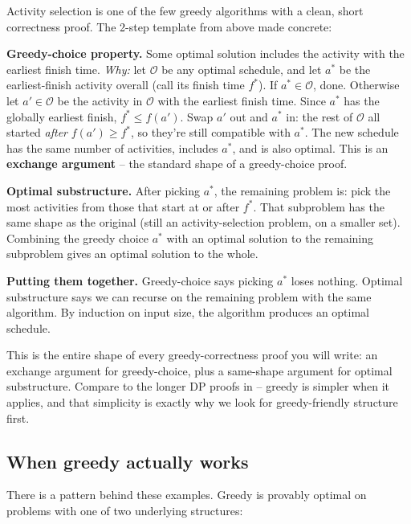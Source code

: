 \documentclass[11pt]{article}
\begin{document}
\begin{examplebox}
Activity selection is one of the few greedy algorithms with a
clean, short correctness proof. The 2-step template from above made
concrete:

\textbf{Greedy-choice property.} Some optimal solution includes the
activity with the earliest finish time. \emph{Why:} let
$\mathcal{O}$ be any optimal schedule, and let $a^*$ be the
earliest-finish activity overall (call its finish time $f^*$). If
$a^* \in \mathcal{O}$, done. Otherwise let $a' \in \mathcal{O}$ be
the activity in $\mathcal{O}$ with the earliest finish time. Since
$a^*$ has the globally earliest finish, $f^* \le f(a')$. Swap $a'$
out and $a^*$ in: the rest of $\mathcal{O}$ all started \emph{after}
$f(a') \ge f^*$, so they're still compatible with $a^*$. The new
schedule has the same number of activities, includes $a^*$, and is
also optimal. This is an \textbf{exchange argument} -- the standard
shape of a greedy-choice proof.

\textbf{Optimal substructure.} After picking $a^*$, the remaining
problem is: pick the most activities from those that start at or
after $f^*$. That subproblem has the same shape as the original
(still an activity-selection problem, on a smaller set). Combining
the greedy choice $a^*$ with an optimal solution to the remaining
subproblem gives an optimal solution to the whole.

\textbf{Putting them together.} Greedy-choice says picking $a^*$
loses nothing. Optimal substructure says we can recurse on the
remaining problem with the same algorithm. By induction on input
size, the algorithm produces an optimal schedule.

This is the entire shape of every greedy-correctness proof you
will write: an exchange argument for greedy-choice, plus a
same-shape argument for optimal substructure. Compare to the longer
DP proofs in  -- greedy is simpler when it
applies, and that simplicity is exactly why we look for
greedy-friendly structure first.
\end{examplebox}

\subsection{When greedy actually works}

There is a pattern behind these examples. Greedy is provably optimal
on problems with one of two underlying structures:
\end{document}
